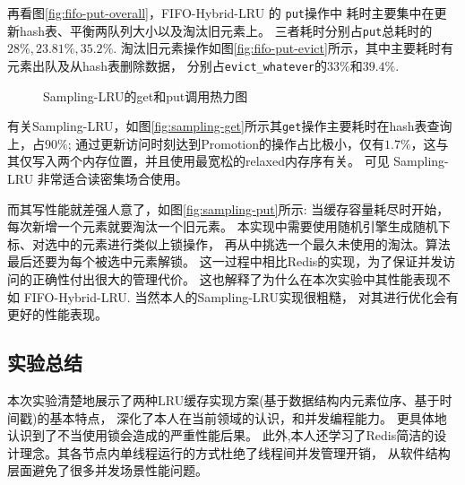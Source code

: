 再看图\ref{fig:fifo-put-overall}，FIFO-Hybrid-LRU 的 \verb|put|操作中
耗时主要集中在更新hash表、平衡两队列大小以及淘汰旧元素上。
三者耗时分别占\verb|put|总耗时的 $28\%, 23.81\%, 35.2\%$. 
淘汰旧元素操作如图\ref{fig:fifo-put-evict}所示，其中主要耗时有元素出队及从hash表删除数据，
分别占\verb|evict_whatever|的$33\%$和$39.4\%$.

\begin{figure}
    \centering
    \caption{Sampling-LRU的get和put调用热力图}
    \label{fig:sampling-get-put}
\end{figure}

有关Sampling-LRU，如图\ref{fig:sampling-get}所示其\verb|get|操作主要耗时在hash表查询上，占$90\%$;
通过更新访问时刻达到Promotion的操作占比极小，仅有$1.7\%$，这与其仅写入两个内存位置，并且使用最宽松的relaxed内存序有关。
可见 Sampling-LRU 非常适合读密集场合使用。

而其写性能就差强人意了，如图\ref{fig:sampling-put}所示:
当缓存容量耗尽时开始，每次新增一个元素就要淘汰一个旧元素。
本实现中需要使用随机引擎生成随机下标、对选中的元素进行类似上锁操作，
再从中挑选一个最久未使用的淘汰。算法最后还要为每个被选中元素解锁。
这一过程中相比Redis的实现，为了保证并发访问的正确性付出很大的管理代价。
这也解释了为什么在本次实验中其性能表现不如 FIFO-Hybrid-LRU.
当然本人的Sampling-LRU实现很粗糙，
对其进行优化会有更好的性能表现。

\subsection{实验总结}

本次实验清楚地展示了两种LRU缓存实现方案(基于数据结构内元素位序、基于时间戳)的基本特点，
深化了本人在当前领域的认识，和并发编程能力。
更具体地认识到了不当使用锁会造成的严重性能后果。
此外,本人还学习了Redis简洁的设计理念。其各节点内单线程运行的方式杜绝了线程间并发管理开销，
从软件结构层面避免了很多并发场景性能问题。

